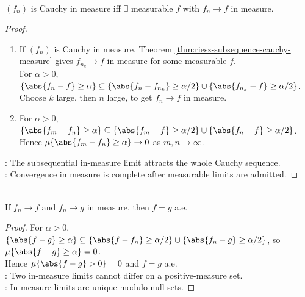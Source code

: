 \begin{corollary} \label{cor:cauchy-in-measure-completion} \\
$(f_n)$ is Cauchy in measure iff $\exists$ measurable $f$ with $f_n\to f$ in measure.
\begin{proof}
\begin{enumerate}[label=\roman*.]
\setlength{\itemsep}{0pt}
\item[$(\Rightarrow)$] If $(f_n)$ is Cauchy in measure, Theorem \ref{thm:riesz-subsequence-cauchy-measure} gives $f_{n_k}\to f$ in measure for some measurable $f$.\\
For $\alpha>0$, $\{\abs{f_n-f}\geq\alpha\}\subseteq\{\abs{f_n-f_{n_k}}\geq\alpha/2\}\cup\{\abs{f_{n_k}-f}\geq\alpha/2\}$.\\
Choose $k$ large, then $n$ large, to get $f_n\to f$ in measure.
\item[$(\Leftarrow)$] For $\alpha>0$, $\{\abs{f_m-f_n}\geq\alpha\}\subseteq\{\abs{f_m-f}\geq\alpha/2\}\cup\{\abs{f_n-f}\geq\alpha/2\}$.\\
Hence $\mu\{\abs{f_m-f_n}\geq\alpha\}\to0$ as $m,n\to\infty$.
\end{enumerate}
: The subsequential in-measure limit attracts the whole Cauchy sequence.\\
: Convergence in measure is complete after measurable limits are admitted.
\end{proof}
\end{corollary}

\begin{corollary} \label{cor:cauchy-in-measure-completion-uniqueness} \label{cor:convergence-in-measure-uniqueness} \\
If $f_n\to f$ and $f_n\to g$ in measure, then $f=g$ a.e.
\begin{proof}
For $\alpha>0$, $\{\abs{f-g}\geq\alpha\}\subseteq\{\abs{f-f_n}\geq\alpha/2\}\cup\{\abs{f_n-g}\geq\alpha/2\}$, so $\mu\{\abs{f-g}\geq\alpha\}=0$.\\
Hence $\mu\{\abs{f-g}>0\}=0$ and $f=g$ a.e.\\
: Two in-measure limits cannot differ on a positive-measure set.\\
: In-measure limits are unique modulo null sets.
\end{proof}
\end{corollary}

